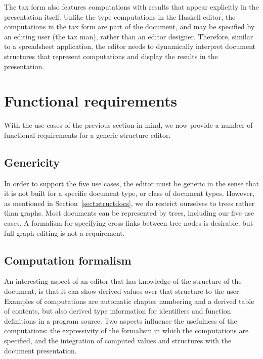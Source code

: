 The tax form also features computations with results that appear explicitly in the presentation itself. Unlike the type computations in the Haskell editor, the computations in the tax form are part of the document, and may be specified by an editing user (the tax man), rather than an editor designer. Therefore, similar to a spreadsheet application, the editor needs to dynamically interpret document structures that represent computations and display the results in the presentation. 

%																
%																
%																
\section{Functional requirements} \label{sect:reqs}

With the use cases of the previous section in mind, we now provide a number of functional requirements for a generic structure editor. 


%																
\subsection{Genericity}

In order to support the five use cases, the editor must be generic in the sense that it is not built for a specific document type, or class of document types. However, as mentioned in Section~\ref{sect:structdocs}, we do restrict ourselves to trees rather than graphs. Most documents can be represented by trees, including our five use cases. A formalism for specifying cross-links between tree nodes is desirable, but full graph editing is not a requirement.



%																
\subsection{Computation formalism}

An interesting aspect of an editor that has knowledge of the structure of the document, is that it can show derived values over that structure to the user. Examples of computations are automatic chapter numbering and a derived table of contents, but also derived type information for identifiers and function definitions in a program source. Two aspects influence the usefulness of the computations: the expressivity of the formalism in which the computations are specified, and the integration of computed values and structures with the document presentation.

